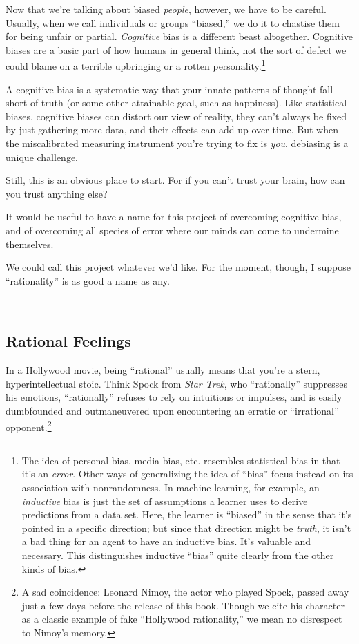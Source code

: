 \documentclass[letterpaper]{book}
\newcommand{\comment}[1]{
}
\begin{document}
{
 Now that we're talking about biased
\textit{people}, however, we have to be careful. Usually, when we call
individuals or groups ``biased,'' we
do it to chastise them for being unfair or partial. \textit{Cognitive}
bias is a different beast altogether. Cognitive biases are a basic part
of how humans in general think, not the sort of defect we could blame
on a terrible upbringing or a rotten personality.\footnote{The idea of personal bias, media bias, etc. resembles
statistical bias in that it's an \textit{error}. Other
ways of generalizing the idea of
``bias'' focus instead on its
association with nonrandomness. In machine learning, for example, an
\textit{inductive} bias is just the set of assumptions a learner uses
to derive predictions from a data set. Here, the learner is
``biased'' in the sense that
it's pointed in a specific direction; but since that
direction might be \textit{truth}, it isn't a bad thing
for an agent to have an inductive bias. It's valuable
and necessary. This distinguishes inductive
``bias'' quite clearly from the
other kinds of bias.\comment{1}}}

{
 A cognitive bias is a systematic way that your innate patterns of
thought fall short of truth (or some other attainable goal, such as
happiness). Like statistical biases, cognitive biases can distort our
view of reality, they can't always be fixed by just
gathering more data, and their effects can add up over time. But when
the miscalibrated measuring instrument you're trying to
fix is \textit{you}, debiasing is a unique challenge.}

{
 Still, this is an obvious place to start. For if you
can't trust your brain, how can you trust anything
else?}

{
 It would be useful to have a name for this project of overcoming
cognitive bias, and of overcoming all species of error where our minds
can come to undermine themselves.}

{
 We could call this project whatever we'd like. For
the moment, though, I suppose
``rationality'' is as good a name as
any.}

{
 ~}

\subsection{Rational Feelings}

{
 In a Hollywood movie, being
``rational'' usually means that
you're a stern, hyperintellectual stoic. Think Spock
from \textit{Star Trek}, who
``rationally'' suppresses his
emotions, ``rationally'' refuses to
rely on intuitions or impulses, and is easily dumbfounded and
outmaneuvered upon encountering an erratic or
``irrational''
opponent.\footnote{A sad coincidence: Leonard Nimoy, the actor who played Spock,
passed away just a few days before the release of this book. Though we
cite his character as a classic example of fake
``Hollywood rationality,'' we mean
no disrespect to Nimoy's memory.\comment{2}}}
\end{document}
